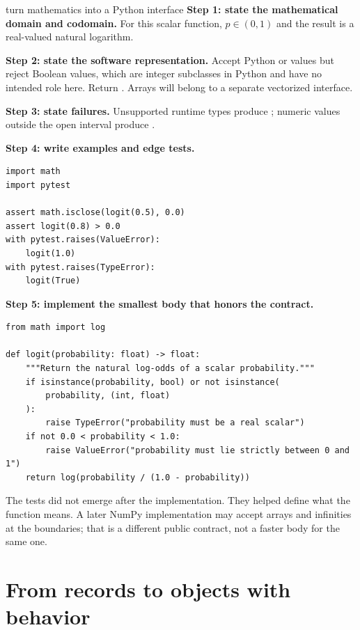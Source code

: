 \begin{workedexample}{turn mathematics into a Python interface}
\textbf{Step 1: state the mathematical domain and codomain.} For this scalar
function, $p\in(0,1)$ and the result is a real-valued natural logarithm.

\textbf{Step 2: state the software representation.} Accept Python  or
 values but reject Boolean values, which are integer subclasses in
Python and have no intended role here. Return . Arrays will belong
to a separate vectorized interface.

\textbf{Step 3: state failures.} Unsupported runtime types produce
; numeric values outside the open interval produce
.

\textbf{Step 4: write examples and edge tests.}

\begin{lstlisting}
import math
import pytest

assert math.isclose(logit(0.5), 0.0)
assert logit(0.8) > 0.0
with pytest.raises(ValueError):
    logit(1.0)
with pytest.raises(TypeError):
    logit(True)
\end{lstlisting}

\textbf{Step 5: implement the smallest body that honors the contract.}

\begin{lstlisting}
from math import log

def logit(probability: float) -> float:
    """Return the natural log-odds of a scalar probability."""
    if isinstance(probability, bool) or not isinstance(
        probability, (int, float)
    ):
        raise TypeError("probability must be a real scalar")
    if not 0.0 < probability < 1.0:
        raise ValueError("probability must lie strictly between 0 and 1")
    return log(probability / (1.0 - probability))
\end{lstlisting}
\end{workedexample}

The tests did not emerge after the implementation. They helped define what the
function means. A later NumPy implementation may accept arrays and infinities at
the boundaries; that is a different public contract, not a faster body for the
same one.

\section{From records to objects with behavior}

